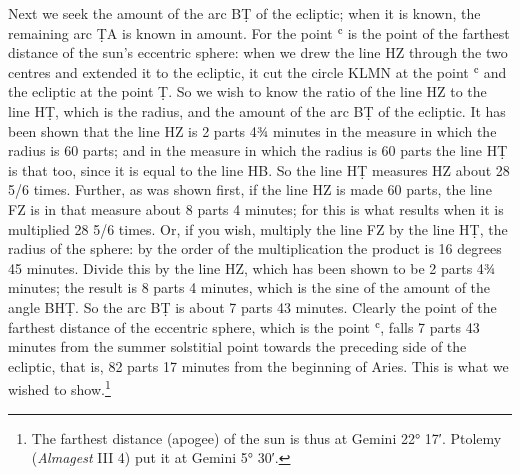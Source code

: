 \documentclass[11pt]{article}
\newcommand{\ArPage}[1]{\marginpar{\footnotesize\color{gray}Ar.\,p.\,#1}}
\begin{document}
\par \ArPage{67}Next we seek the amount of the arc BṬ of the ecliptic; when it is known, the remaining arc ṬA is known in amount. For the point ʿ is the point of the farthest distance of the sun's eccentric sphere: when we drew the line HZ through the two centres and extended it to the ecliptic, it cut the circle KLMN at the point ʿ and the ecliptic at the point Ṭ. So we wish to know the ratio of the line HZ to the line HṬ, which is the radius, and the amount of the arc BṬ of the ecliptic. It has been shown that the line HZ is 2 parts 4¾ minutes in the measure in which the radius is 60 parts; and in the measure in which the radius is 60 parts the line HṬ is that too, since it is equal to the line HB. So the line HṬ measures HZ about 28 5/6 times. Further, as was shown first, if the line HZ is made 60 parts, the line FZ is in that measure about 8 parts 4 minutes; for this is what results when it is multiplied 28 5/6 times. Or, if you wish, multiply the line FZ by the line HṬ, the radius of the sphere: by the order of the multiplication the product is 16 degrees 45 minutes. Divide this by the line HZ, which has been shown to be 2 parts 4¾ minutes; the result is 8 parts 4 minutes, which is the sine of the amount of the angle BHṬ. So the arc BṬ is about 7 parts 43 minutes. Clearly the point of the farthest distance of the eccentric sphere, which is the point ʿ, falls 7 parts 43 minutes from the summer solstitial point towards the preceding side of the ecliptic, that is, 82 parts 17 minutes from the beginning of Aries. This is what we wished to show.\footnote{The farthest distance (apogee) of the sun is thus at Gemini 22° 17′. Ptolemy (\emph{Almagest} III 4) put it at Gemini 5° 30′.}\par
\end{document}
